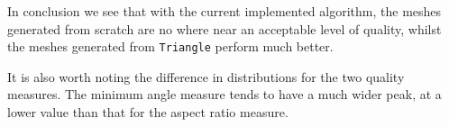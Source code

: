 \documentclass[sigconf]{acmart}
\begin{document}
In conclusion we see that with the current implemented algorithm, the meshes generated from scratch are no where near an acceptable level of quality, whilst the meshes generated from \texttt{Triangle} perform much better. 

It is also worth noting the difference in distributions for the two quality measures. The minimum angle measure tends to have a much wider peak, at a lower value than that for the aspect ratio measure.
\end{document}
